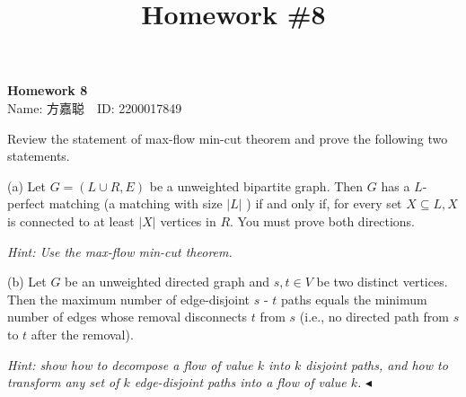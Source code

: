 \documentclass[11pt]{article}
\title{Homework \#8}
\newenvironment{problem}[2][Problem]{\begin{trivlist}
    \item[\hskip \labelsep{\bfseries#1}\hskip\labelsep{\bfseries#2.}]\mbox{}\newline}{\hfill$\blacktriangleleft$\end{trivlist}}
\begin{document}
\kaishu

\pagestyle{fancy}
\chead{}

\begin{center}
    {\LARGE \bf Homework 8}\\
    {Name: 方嘉聪\ \  ID: 2200017849}            %
\end{center}

\begin{problem}{1. (Applications of Max-Flow Min-Cut)}
Review the statement of max-flow min-cut theorem and prove the following two statements.

(a) Let $G=(L \cup R, E)$ be a unweighted bipartite graph. Then $G$ has a $L$-perfect matching (a matching with size $|L|$ ) if and only if, for every set $X \subseteq L, X$ is connected to at least $|X|$ vertices in $R$. You must prove both directions.

\textit{Hint: Use the max-flow min-cut theorem.}

(b) Let $G$ be an unweighted directed graph and $s, t \in V$ be two distinct vertices. Then the maximum number of edge-disjoint $s$ - $t$ paths equals the minimum number of edges whose removal disconnects $t$ from $s$ (i.e., no directed path from $s$ to $t$ after the removal).

\textit{Hint: show how to decompose a flow of value $k$ into $k$ disjoint paths, and how to transform any set of $k$ edge-disjoint paths into a flow of value $k$.}
\end{problem}
\end{document}
